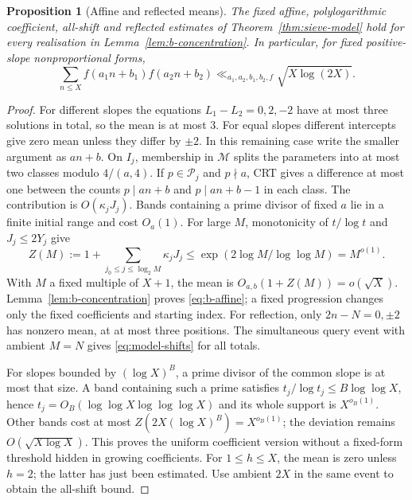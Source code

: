 \documentclass[11pt]{article}
\newtheorem{proposition}[theorem]{Proposition}
\theoremstyle{definition}
\theoremstyle{remark}
\numberwithin{equation}{section}
\begin{document}
\begin{proposition}[Affine and reflected means]\label{prop:b-affine}
The fixed affine, polylogarithmic coefficient, all-shift and reflected estimates of
Theorem~\ref{thm:sieve-model} hold for every realisation in Lemma~\ref{lem:b-concentration}.
In particular, for fixed positive-slope nonproportional forms,
\begin{equation}\label{eq:b-affine}
 \sum_{n\le X}f(a_1n+b_1)f(a_2n+b_2)\ll_{a_1,a_2,b_1,b_2,f}\sqrt{X\log(2X)}.
\end{equation}
\end{proposition}
\begin{proof}
For different slopes the equations $L_1-L_2=0,2,-2$ have at most three solutions in total,
so the mean is at most $3$. For equal slopes different intercepts give zero mean unless they differ by
$\pm2$. In this remaining case write the smaller argument as $an+b$.
On $I_j$, membership in $\mathcal M$ splits the parameters into at most two classes modulo
$4/(a,4)$. If $p\in\mathcal P_j$ and $p\nmid a$, CRT gives a difference at most one between the counts
$p\mid an+b$ and $p\mid an+b-1$ in each class. The contribution is $O(\kappa_jJ_j)$.
Bands containing a prime divisor of fixed $a$ lie in a finite initial range and cost $O_a(1)$.
For large $M$, monotonicity of $t/\log t$ and $J_j\le2Y_j$ give
\begin{equation}\label{eq:b-z}
 Z(M):=1+\sum_{j_0\le j\le\log_2M}\kappa_jJ_j
 \le\exp(2\log M/\log\log M)=M^{o(1)}.
\end{equation}
With $M$ a fixed multiple of $X+1$, the mean is $O_{a,b}(1+Z(M))=o(\sqrt X)$.
Lemma~\ref{lem:b-concentration} proves \eqref{eq:b-affine}; a fixed progression changes only the fixed
coefficients and starting index.
For reflection, only $2n-N=0,\pm2$ has nonzero mean, at at most three positions. The simultaneous
query event with ambient $M=N$ gives \eqref{eq:model-shifts} for all totals.

For slopes bounded by $(\log X)^B$, a prime divisor of the common slope is at most that size.
A band containing such a prime satisfies $t_j/\log t_j\le B\log\log X$, hence
$t_j=O_B(\log\log X\log\log\log X)$ and its whole support is $X^{o_B(1)}$.
Other bands cost at most $Z(2X(\log X)^B)=X^{o_B(1)}$; the deviation remains
$O(\sqrt{X\log X})$. This proves the uniform coefficient version without a fixed-form threshold
hidden in growing coefficients. For $1\le h\le X$, the mean is zero unless $h=2$; the latter has just
been estimated. Use ambient $2X$ in the same event to obtain the all-shift bound.
\end{proof}
\end{document}

